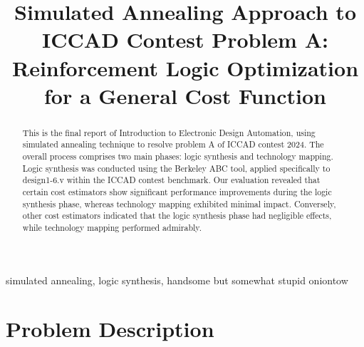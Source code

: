\documentclass[conference]{IEEEtran}
\begin{document}
\title{Simulated Annealing Approach to ICCAD Contest Problem A: Reinforcement Logic Optimization for a General Cost Function\\}


\author{
\and
{}
\and
{}
}

\maketitle

\begin{abstract}
This is the final report of Introduction to Electronic Design Automation, using simulated annealing technique to resolve problem A of ICCAD contest 2024.
The overall process comprises two main phases: logic synthesis and technology mapping. Logic synthesis was conducted using the Berkeley ABC tool, applied specifically to design1-6.v within the ICCAD contest benchmark. Our evaluation revealed that certain cost estimators show significant performance improvements during the logic synthesis phase, whereas technology mapping exhibited minimal impact. Conversely, other cost estimators indicated that the logic synthesis phase had negligible effects, while technology mapping performed admirably.
\end{abstract}

\begin{IEEEkeywords}
simulated annealing, logic synthesis, handsome but somewhat stupid oniontow
\end{IEEEkeywords}

\section{Problem Description}
\end{document}
